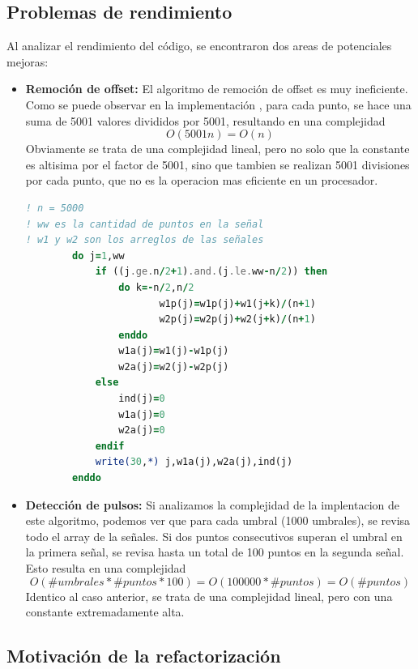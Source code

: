 \documentclass[12pt,a4paper]{article}
\begin{document}
\subsection{Problemas de rendimiento}

Al analizar el rendimiento del código, se encontraron dos areas de potenciales mejoras:

\begin{itemize}
    \item \textbf{Remoción de offset:} El algoritmo de remoción de offset es muy ineficiente. Como se puede observar en la implementación , para cada punto, se hace una suma de 5001 valores divididos por 5001,
    resultando en una complejidad $$O(5001n) = O(n)$$ Obviamente se trata de una complejidad lineal, pero no solo que la constante es altisima por el factor de 5001, sino que tambien se realizan 5001 divisiones por cada punto, que no es la operacion mas eficiente en un procesador.

    \begin{lstlisting}[language=Fortran, label=lst:codigo_remocion_offset, caption={buscador\_de\_gotas.f - Algoritmo ineficiente de remoción de offset}]
! n = 5000
! ww es la cantidad de puntos en la señal
! w1 y w2 son los arreglos de las señales
        do j=1,ww
            if ((j.ge.n/2+1).and.(j.le.ww-n/2)) then
                do k=-n/2,n/2
                       w1p(j)=w1p(j)+w1(j+k)/(n+1)
                       w2p(j)=w2p(j)+w2(j+k)/(n+1)            
                enddo
                w1a(j)=w1(j)-w1p(j)
                w2a(j)=w2(j)-w2p(j)
            else 
                ind(j)=0
                w1a(j)=0
                w2a(j)=0
            endif	
            write(30,*) j,w1a(j),w2a(j),ind(j)
        enddo
    \end{lstlisting}


    \item \textbf{Detección de pulsos:} Si analizamos la complejidad de la implentacion de este algoritmo, podemos ver que para cada umbral (1000 umbrales), se revisa todo el array de la señales. Si dos puntos consecutivos superan el umbral en la primera señal, se revisa hasta un total de 100 puntos en la segunda señal. Esto resulta en una complejidad $$O(\#umbrales * \#puntos * 100) = O(100000 * \#puntos) = O(\#puntos)$$ Identico al caso anterior, se trata de una complejidad lineal, pero con una constante extremadamente alta.
\end{itemize}

\subsection{Motivación de la refactorización}
\end{document}
